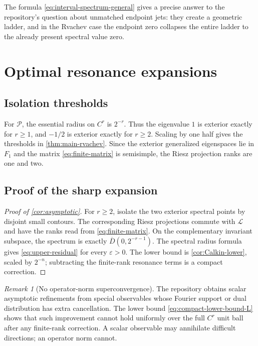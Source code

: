 \documentclass[11pt,a4paper]{article}
\theoremstyle{definition}
\theoremstyle{remark}
\newtheorem{remark}[theorem]{Remark}
\newcommand{\Dbar}[1]{\overline{D}(0,#1)}
\newcommand{\Lop}{\mathcal L}
\newcommand{\Pop}{\mathcal P}
\begin{document}
The formula \eqref{eq:interval-spectrum-general} gives a precise answer to
the repository's question about unmatched endpoint jets: they create a
geometric ladder, and in the Rvachev case the endpoint zero collapses the
entire ladder to the already present spectral value zero.

\section{Optimal resonance expansions}
\label{sec:resonance-expansions}

\subsection{Isolation thresholds}
For $\Pop$, the essential radius on $C^r$ is $2^{-r}$.  Thus the eigenvalue
$1$ is exterior exactly for $r\ge1$, and $-1/2$ is exterior exactly for
$r\ge2$.  Scaling by one half gives the thresholds in
\cref{thm:main-rvachev}.  Since the exterior generalized eigenspaces lie in
$F_1$ and the matrix \eqref{eq:finite-matrix} is semisimple, the Riesz
projection ranks are one and two.

\subsection{Proof of the sharp expansion}
\begin{proof}[Proof of \cref{cor:asymptotic}]
For $r\ge2$, isolate the two exterior spectral points by disjoint small
contours.  The corresponding Riesz projections commute with $\Lop$ and have
the ranks read from \eqref{eq:finite-matrix}.  On the complementary invariant
subspace, the spectrum is exactly $\Dbar{2^{-r-1}}$.  The spectral radius
formula gives \eqref{eq:upper-residual} for every $\varepsilon>0$.
The lower bound is \cref{cor:Calkin-lower}, scaled by $2^{-n}$; subtracting
the finite-rank resonance terms is a compact correction.
\end{proof}

\begin{remark}[No operator-norm superconvergence]
The repository obtains scalar asymptotic refinements from special observables
whose Fourier support or dual distribution has extra cancellation.  The lower
bound \eqref{eq:compact-lower-bound-L} shows that such improvement cannot hold
uniformly over the full $C^r$ unit ball after any finite-rank correction.  A
scalar observable may annihilate difficult directions; an operator norm
cannot.
\end{remark}
\end{document}
